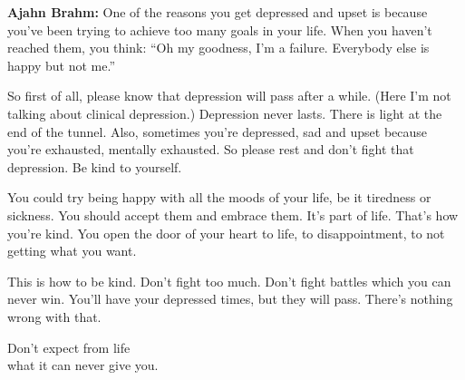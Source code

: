 \documentclass[12pt, openany]{book}
\newcommand{\blankpage}{
\newpage
\thispagestyle{empty}
\mbox{}
\newpage
}
\newenvironment{aphorism}%
{%
\begin{center}\begin{itshape}
}%
{\end{itshape}\end{center}
}%
\newcommand{\fleuron}{%
\begin{center}
\vspace{2em}
\fallbackfont{❦}
\end{center}
}
\begin{document}
\textbf{Ajahn Brahm:} One of the reasons you get depressed and upset is because you’ve been trying to achieve too many goals in your life. When you haven’t reached them, you think: “Oh my goodness, I’m a failure. Everybody else is happy but not me.” 

So first of all, please know that depression will pass after a while. (Here I’m not talking about clinical depression.) Depression never lasts. There is light at the end of the tunnel. Also, sometimes you’re depressed, sad and upset because you’re exhausted, mentally exhausted. So please rest and don’t fight that depression. Be kind to yourself. 

You could try being happy with all the moods of your life, be it tiredness or sickness. You should accept them and embrace them. It’s part of life. That’s how you’re kind. You open the door of your heart to life, to disappointment, to not getting what you want. 

This is how to be kind. Don’t fight too much. Don’t fight battles which you can never win. You’ll have your depressed times, but they will pass. There’s nothing wrong with that. 🤩

\begin{aphorism}
Don’t expect from life\\  
what it can never give you.
\end{aphorism}

\fleuron
\blankpage
\blankpage
\end{document}
